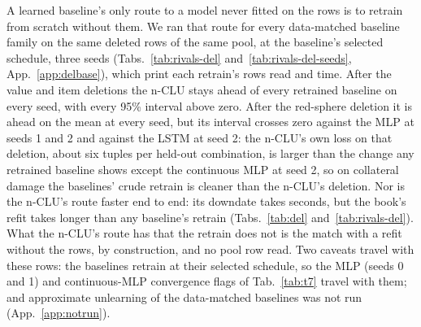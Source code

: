 \documentclass{article} %
\begin{document}
A learned baseline's only route to a model never fitted on the rows is to retrain from scratch without them. We ran
that route for every data-matched baseline family on the same deleted rows of the same %
pool, at the baseline's selected schedule, three seeds (Tabs.~\ref{tab:rivals-del}
and~\ref{tab:rivals-del-seeds}, App.~\ref{app:delbase}), which print each retrain's rows read %
and time. After the value and item deletions the n-CLU stays ahead of every %
retrained baseline on every seed, with every 95\% interval above %
zero. After the red-sphere deletion it is ahead on the mean at every seed, but its interval crosses
zero against the MLP at seeds 1 and 2 and against the LSTM at seed 2: %
the n-CLU's own loss on that deletion, about six tuples per held-out combination, is larger than the %
change any retrained baseline shows except the continuous MLP at seed 2, so on %
collateral damage the baselines' crude retrain is cleaner than the n-CLU's deletion. Nor is the
n-CLU's route faster end to end: its downdate takes seconds, but the book's refit takes longer %
than any baseline's retrain (Tabs.~\ref{tab:del} and~\ref{tab:rivals-del}). What the n-CLU's route has that the retrain does not %
is the match with a refit without the rows, by construction, and no pool row read. Two caveats travel with these rows: the baselines
retrain at their selected schedule, so the MLP (seeds 0 and 1) and continuous-MLP convergence flags
of Tab.~\ref{tab:t7} travel with them; and approximate unlearning of the data-matched baselines was not
run (App.~\ref{app:notrun}).
\end{document}
